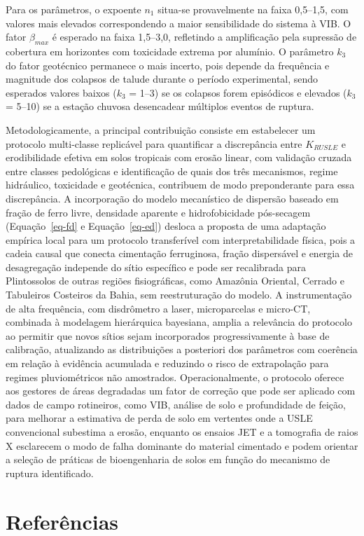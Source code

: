 \documentclass[
  brazilian,
  authoryear,
  preprint]{elsarticle}
\begin{document}
Para os parâmetros, o expoente \(n_1\) situa-se provavelmente na faixa
0,5--1,5, com valores mais elevados correspondendo a maior sensibilidade
do sistema à VIB. O fator \(\beta_{max}\) é esperado na faixa 1,5--3,0,
refletindo a amplificação pela supressão de cobertura em horizontes com
toxicidade extrema por alumínio. O parâmetro \(k_3\) do fator geotécnico
permanece o mais incerto, pois depende da frequência e magnitude dos
colapsos de talude durante o período experimental, sendo esperados
valores baixos (\(k_3\) = 1--3) se os colapsos forem episódicos e
elevados (\(k_3\) = 5--10) se a estação chuvosa desencadear múltiplos
eventos de ruptura.

Metodologicamente, a principal contribuição consiste em estabelecer um
protocolo multi-classe replicável para quantificar a discrepância entre
\(K_{RUSLE}\) e erodibilidade efetiva em solos tropicais com erosão
linear, com validação cruzada entre classes pedológicas e identificação
de quais dos três mecanismos, regime hidráulico, toxicidade e
geotécnica, contribuem de modo preponderante para essa discrepância. A
incorporação do modelo mecanístico de dispersão baseado em fração de
ferro livre, densidade aparente e hidrofobicidade pós-secagem
(Equação~\ref{eq-fd} e Equação~\ref{eq-ed}) desloca a proposta de uma
adaptação empírica local para um protocolo transferível com
interpretabilidade física, pois a cadeia causal que conecta cimentação
ferruginosa, fração dispersável e energia de desagregação independe do
sítio específico e pode ser recalibrada para Plintossolos de outras
regiões fisiográficas, como Amazônia Oriental, Cerrado e Tabuleiros
Costeiros da Bahia, sem reestruturação do modelo. A instrumentação de
alta frequência, com disdrômetro a laser, microparcelas e micro-CT,
combinada à modelagem hierárquica bayesiana, amplia a relevância do
protocolo ao permitir que novos sítios sejam incorporados
progressivamente à base de calibração, atualizando as distribuições a
posteriori dos parâmetros com coerência em relação à evidência acumulada
e reduzindo o risco de extrapolação para regimes pluviométricos não
amostrados. Operacionalmente, o protocolo oferece aos gestores de áreas
degradadas um fator de correção que pode ser aplicado com dados de campo
rotineiros, como VIB, análise de solo e profundidade de feição, para
melhorar a estimativa de perda de solo em vertentes onde a USLE
convencional subestima a erosão, enquanto os ensaios JET e a tomografia
de raios X esclarecem o modo de falha dominante do material cimentado e
podem orientar a seleção de práticas de bioengenharia de solos em função
do mecanismo de ruptura identificado.

\section{Referências}\label{referuxeancias}

\renewcommand{\bibsection}{}

\end{document}
